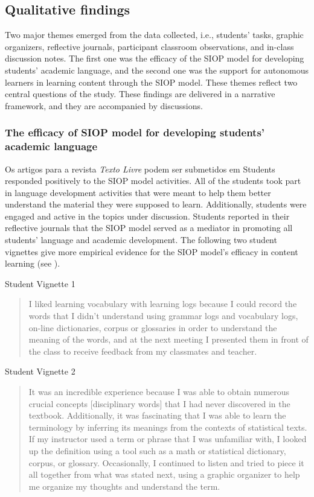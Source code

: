 \documentclass[english]{textolivre}
\begin{document}
\subsection{Qualitative findings}\label{sec-titulo}
Two major themes emerged from the data collected, i.e., students' tasks, graphic organizers, reflective journals, participant classroom observations, and in-class discussion notes. The first one was the efficacy of the SIOP model for developing students’ academic language, and the second one was the support for autonomous learners in learning content through the SIOP model. These themes reflect two central questions of the study. These findings are delivered in a narrative framework, and they are accompanied by discussions.

\subsubsection{The efficacy of SIOP model for developing students’ academic language}\label{sec-idioma}
Os artigos para a revista \textit{Texto Livre} podem ser submetidos em Students responded positively to the SIOP model activities. All of the students took part in language development activities that were meant to help them better understand the material they were supposed to learn. Additionally, students were engaged and active in the topics under discussion. Students reported in their reflective journals that the SIOP model served as a mediator in promoting all students' language and academic development. The following two student vignettes give more empirical evidence for the SIOP model's efficacy in content learning (see \textcite{hansen-thomas_sheltered_2008}).

Student Vignette 1

\begin{quote}
    I liked learning vocabulary with learning logs because I could record the words that I didn’t understand using grammar logs and vocabulary logs, on-line dictionaries, corpus or glossaries in order to understand the meaning of the words, and at the next meeting I presented them in front of the class to receive feedback from my classmates and teacher.
\end{quote}

Student Vignette 2

\begin{quote}
    It was an incredible experience because I was able to obtain numerous crucial concepts [disciplinary words] that I had never discovered in the textbook. Additionally, it was fascinating that I was able to learn the terminology by inferring its meanings from the contexts of statistical texts. If my instructor used a term or phrase that I was unfamiliar with, I looked up the definition using a tool such as a math or statistical dictionary, corpus, or glossary. Occasionally, I continued to listen and tried to piece it all together from what was stated next, using a graphic organizer to help me organize my thoughts and understand the term.
\end{quote}
\end{document}
